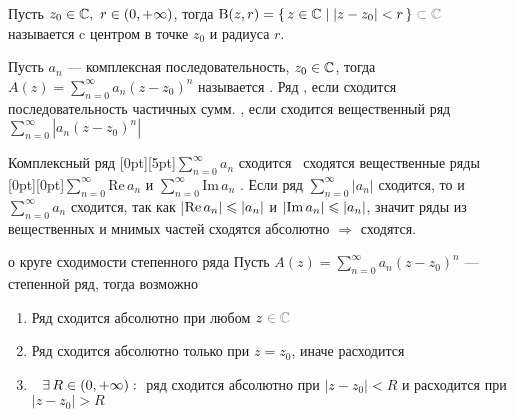 
\begin{opr}
	Пусть $z_0 \in \mathbb{C},\ r \in (0, +\infty)$, тогда $\B{z, r} = \{\,z \in \cc \mid |z - z_0| < r \,\} \uns{{}\subset \cc}$ называется  c центром в точке $z_0$ и радиуса $r$.
\end{opr}

\begin{opr}
	Пусть $a_n$ --- комплексная последовательность, $z_0 \in \mathbb{C}$, тогда $A(z) = \sum\limits_{n = 0}^{\infty} a_n(z - z_0)^n$ называется  . Ряд , если сходится последовательность частичных сумм. , если сходится вещественный ряд $\sum\limits_{n = 0}^{\infty} |a_n(z - z_0)^n|$
\end{opr}

\begin{zam}
	Комплексный ряд \raisebox{0pt}[0pt][5pt]{$\sum\limits_{n = 0}^{\infty} a_n$} сходится \eq\ сходятся вещественные ряды \raisebox{0pt}[0pt][0pt]{$\sum\limits_{n = 0}^{\infty} \mathrm{Re}\, a_n$} и $\sum\limits_{n = 0}^{\infty} \mathrm{Im}\, a_n$ . 
	Если ряд $\sum\limits_{n = 0}^{\infty} |a_n|$ сходится, то и $\sum\limits_{n = 0}^{\infty} a_n$ сходится, так как |$\mathrm{Re}\, a_n| \leqslant |a_n|$ и $|\mathrm{Im}\, a_n| \leqslant |a_n|$, значит ряды из вещественных и мнимых \medskip частей сходятся абсолютно $\Rightarrow$ сходятся. 
\end{zam}

\begin{teor}[https://youtu.be/zgKkH3Nr6-4?si=MvlhhJxcgF8KG0Mf&t=2204]{о круге сходимости степенного ряда}\label{круг сходимости}
	Пусть $A(z) = \sum\limits_{n = 0}^{\infty} a_n(z - z_0)^n$ --- степенной ряд, тогда возможно
	\begin{enumerate}
		\item Ряд сходится абсолютно при любом $z \uns{{} \in \cc}$
		
		\item Ряд сходится абсолютно только при $z = z_0$, иначе расходится
		
		\item \hspace{-5pt}$\E R \in (0, +\infty) : {}$ ряд сходится абсолютно при $|z - z_0| < R$ и расходится при $|z - z_0| > R$ 
	\end{enumerate}
\end{teor}

